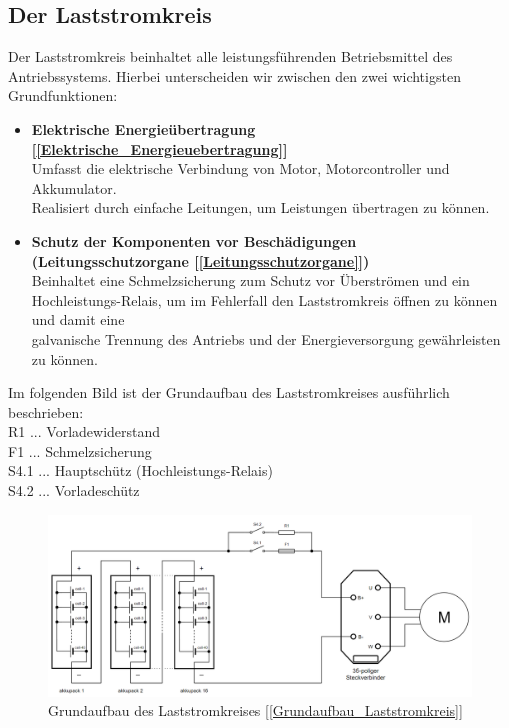 \subsection{Der Laststromkreis}
\label{Laststromkreis}
Der Laststromkreis beinhaltet alle leistungsführenden Betriebsmittel des Antriebssystems. Hierbei unterscheiden wir zwischen den zwei wichtigsten Grundfunktionen:
\\[5mm]
\begin{itemize}
	\item \textbf{Elektrische Energieübertragung [\ref{Elektrische_Energieuebertragung}]}
	\\ \medskip Umfasst die elektrische Verbindung von Motor, Motorcontroller und Akkumulator. \\ Realisiert durch einfache Leitungen, um Leistungen übertragen zu können.
	\medskip
	\item \textbf{Schutz der Komponenten vor Beschädigungen (Leitungsschutzorgane [\ref{Leitungsschutzorgane}])}
	\\ \medskip Beinhaltet eine Schmelzsicherung zum Schutz vor Überströmen und ein 					\\ Hochleistungs-Relais, um im Fehlerfall den Laststromkreis öffnen zu können und damit eine  		
	\\ galvanische Trennung des Antriebs und der Energieversorgung gewährleisten zu können.
\end{itemize}
\vspace{5mm}

Im folgenden Bild ist der Grundaufbau des Laststromkreises ausführlich beschrieben:
\vspace{2mm}
\\R1 ... Vorladewiderstand
\\F1 ... Schmelzsicherung
\\S4.1 ... Hauptschütz (Hochleistungs-Relais)
\\S4.2 ... Vorladeschütz
\vspace{5mm}
\begin{figure}[H]
	\begin{center}
		\includegraphics[scale=0.35]{figures/Antrieb/Antrieb_Laststromkreis.png}
		\caption{Grundaufbau des Laststromkreises [\ref{Grundaufbau_Laststromkreis}]}
	\end{center}
\end{figure}

